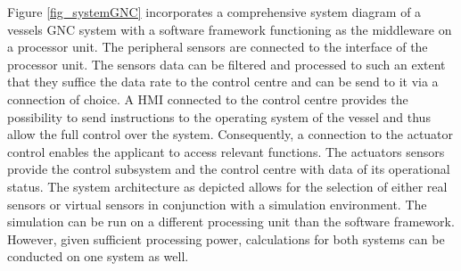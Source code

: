  Figure \ref{fig_systemGNC} incorporates a comprehensive system diagram of a vessels \ac{GNC} system with a software framework functioning as the middleware on a processor unit. The peripheral sensors are connected to the interface of the processor unit. The sensors data can be filtered and processed to such an extent that they suffice the data rate to the control centre and can be send to it via a connection of choice. A \ac{HMI} connected to the control centre provides the possibility to send instructions to the operating system of the vessel and thus allow the full control over the system. Consequently, a connection to the actuator control enables the applicant to access relevant functions. The actuators sensors provide the control subsystem and the control centre with data of its operational status. The system architecture as depicted allows for the selection of either real sensors or virtual sensors in conjunction with a simulation environment. The simulation can be run on a different processing unit than the software framework. However, given sufficient processing power, calculations for both systems can be conducted on one system as well.
  
